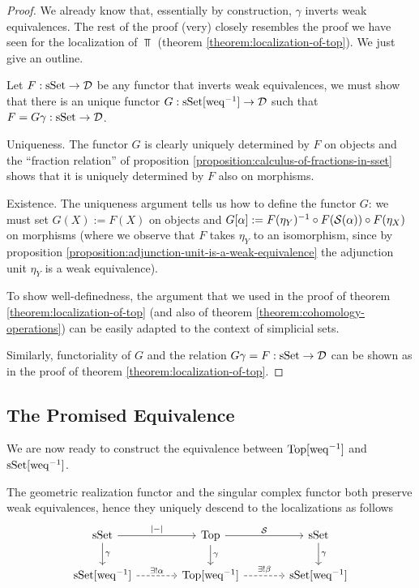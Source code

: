 \begin{proof}
We already know that, essentially by construction, $\gamma$ inverts weak equivalences. The rest of the proof (very) closely resembles the proof we have seen for the localization of $\Top$ (theorem \ref{theorem:localization-of-top}). We just give an outline.

Let $F:{\mathrm{sSet}}\to\mathcal{D}$ be any functor that inverts weak equivalences, we must show that there is an unique functor $G:{\mathrm{sSet}}[\operatorname{\,\!weq}^{-1}]\to\mathcal{D}$ such that $F=G\gamma:{\mathrm{sSet}}\to\mathcal{D}$.

Uniqueness. The functor $G$ is clearly uniquely determined by $F$ on objects and the \enquote{fraction relation} of proposition \ref{proposition:calculus-of-fractions-in-sset} shows that it is uniquely determined by $F$ also on morphisms.

Existence. The uniqueness argument tells us how to define the functor $G$: we must set $G(X):=F(X)$ on objects and $G[\alpha]:=F(\eta_Y)^{-1}\circ F(\mathcal{S}(\alpha))\circ F(\eta_X)$ on morphisms (where we observe that $F$ takes $\eta_Y$ to an isomorphism, since by proposition \ref{proposition:adjunction-unit-is-a-weak-equivalence} the adjunction unit $\eta_Y$ is a weak equivalence).

To show well-definedness, the argument that we used in the proof of theorem \ref{theorem:localization-of-top} (and also of theorem \ref{theorem:cohomology-operations}) can be easily adapted to the context of simplicial sets.

Similarly, functoriality of $G$ and the relation $G\gamma=F:{\mathrm{sSet}}\to\mathcal{D}$ can be shown as in the proof of theorem \ref{theorem:localization-of-top}.
\end{proof}

\subsection{The Promised Equivalence}

We are now ready to construct the equivalence between ${\mathrm{Top}}[\operatorname{\,\!weq}^{-1}]$ and ${\mathrm{sSet}}[\operatorname{\,\!weq}^{-1}]$.

The geometric realization functor and the singular complex functor both preserve weak equivalences, hence they uniquely descend to the localizations as follows
\[
\begin{tikzcd}[column sep=large]
\sSet \ar[d,"\gamma"] \ar[r,"{|-|}"] & \Top \ar[d,"\gamma"] \ar[r,"\S"] & \sSet \ar[d,"\gamma"]\\
\sSet[\weq^\inv] \ar[r,dashed,"\exists!\alpha"] & \Top[\weq^\inv] \ar[r,dashed,"\exists!\beta"] & \sSet[\weq^\inv]
\end{tikzcd}
\]

